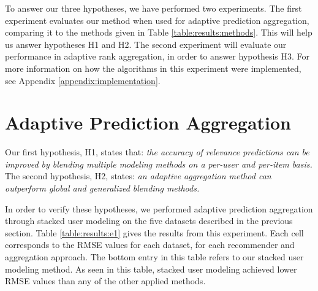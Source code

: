 To answer our three hypotheses, we have performed two experiments.
The first experiment evaluates our method when used for
adaptive prediction aggregation, comparing it to 
the methods given in Table \ref{table:results:methods}.
This will help us answer hypotheses H1 and H2.
The second experiment will evaluate our performance
in adaptive rank aggregation, in order to answer hypothesis H3.
For more information on how the algorithms
in this experiment were implemented, see Appendix \ref{appendix:implementation}.

\clearpage
\section{Adaptive Prediction Aggregation}

Our first hypothesis, H1, states that:
{
  \itshape
  the accuracy of relevance predictions can be improved
  by blending multiple modeling methods on a per-user and per-item basis.
}
The second hypothesis, H2, states:
{
  \itshape
  an adaptive aggregation method can outperform global and generalized 
  blending methods.
}

In order to verify these hypotheses, we performed adaptive prediction aggregation
through stacked user modeling on the five datasets described in the previous section.
Table \ref{table:results:e1} gives the results from this experiment.
Each cell corresponds to the RMSE values for each dataset,
for each recommender and aggregation approach.
The bottom entry in this table refers to our stacked user modeling method.
As seen in this table, stacked user modeling achieved
lower RMSE values than any of the other applied methods.

